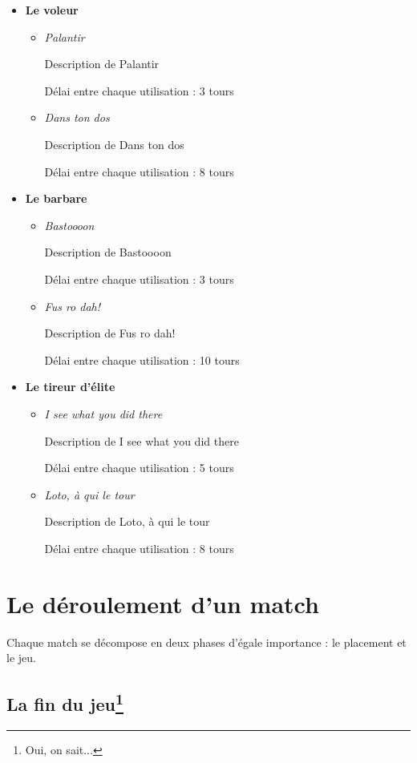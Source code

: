 \begin{itemize}
\item \textbf{Le voleur}
  \begin{itemize}
  \item \textit{Palantir}

    Description de Palantir

    Délai entre chaque utilisation : 3 tours
  \item \textit{Dans ton dos}

    Description de Dans ton dos

    Délai entre chaque utilisation : 8 tours
  \end{itemize}
\item \textbf{Le barbare}
  \begin{itemize}
  \item \textit{Bastoooon}

    Description de Bastoooon

    Délai entre chaque utilisation : 3 tours
  \item \textit{Fus ro dah!}

    Description de Fus ro dah!

    Délai entre chaque utilisation : 10 tours
  \end{itemize}
\item \textbf{Le tireur d'élite}
  \begin{itemize}
  \item \textit{I see what you did there}

    Description de I see what you did there

    Délai entre chaque utilisation : 5 tours
  \item \textit{Loto, à qui le tour}

    Description de Loto, à qui le tour

    Délai entre chaque utilisation : 8 tours
  \end{itemize}
\end{itemize}

\newpage
\section{Le déroulement d'un match}

Chaque match se décompose en deux phases d'égale importance : le
placement et le jeu.

\subsection[La fin du jeu]{La fin du jeu\protect\footnote{Oui, on sait...}}

